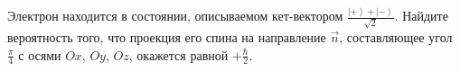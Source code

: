 \documentclass[__main__.tex]{subfiles}
\begin{document}
Электрон находится в состоянии, описываемом кет-вектором $\frac{\left|+\right>+\left|-\right>}{\sqrt{2}}$. Найдите вероятность того, что проекция его спина на направление $\vec{n}$, составляющее угол $\frac{\pi}{4}$ с осями $Ox$, $Oy$, $Oz$, окажется равной $+\frac{\hbar}{2}$.\\ 

\end{document}
